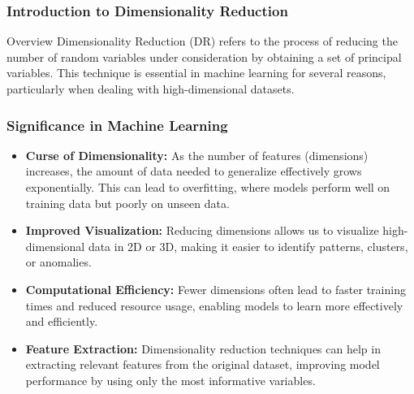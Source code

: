 \documentclass[aspectratio=169]{beamer}
\begin{document}
\frame{\titlepage}

\begin{frame}[fragile]
    \frametitle{Introduction to Dimensionality Reduction}
    \begin{block}{Overview}
        Dimensionality Reduction (DR) refers to the process of reducing the number of random variables under consideration by obtaining a set of principal variables. This technique is essential in machine learning for several reasons, particularly when dealing with high-dimensional datasets.
    \end{block}
\end{frame}

\begin{frame}[fragile]
    \frametitle{Significance in Machine Learning}
    \begin{itemize}
        \item \textbf{Curse of Dimensionality:} 
        As the number of features (dimensions) increases, the amount of data needed to generalize effectively grows exponentially. This can lead to overfitting, where models perform well on training data but poorly on unseen data.
        
        \item \textbf{Improved Visualization:} 
        Reducing dimensions allows us to visualize high-dimensional data in 2D or 3D, making it easier to identify patterns, clusters, or anomalies.
        
        \item \textbf{Computational Efficiency:} 
        Fewer dimensions often lead to faster training times and reduced resource usage, enabling models to learn more effectively and efficiently.
        
        \item \textbf{Feature Extraction:} 
        Dimensionality reduction techniques can help in extracting relevant features from the original dataset, improving model performance by using only the most informative variables.
    \end{itemize}
\end{frame}
\end{document}
